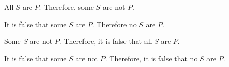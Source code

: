 \begin{exercises}
\item  All $S$ are $P$. Therefore, some $S$ are not $P$.



\item It is false that some $S$ are $P$. Therefore no $S$ are $P$.


 


\item Some $S$ are not $P$. Therefore, it is false that all $S$ are $P$. 		

\item It is false that some $S$ are not $P$. Therefore, it is false that no $S$ are $P$.


\end{exercises}
